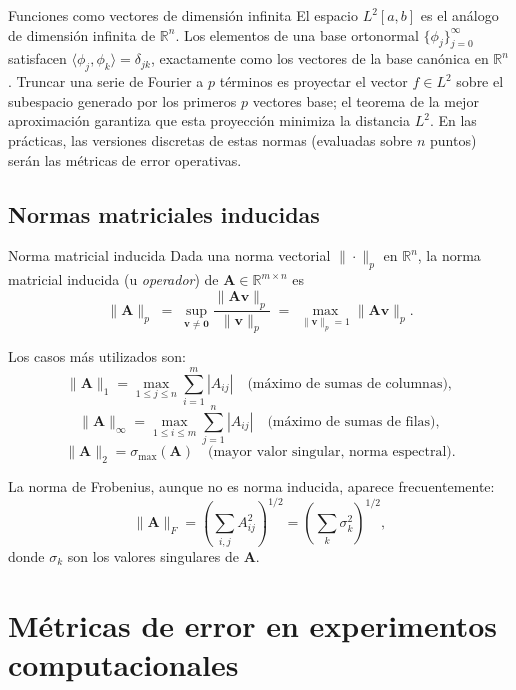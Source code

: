 \begin{fisicaconexion}{Funciones como vectores de dimensión infinita}
El espacio $L^2[a,b]$ es el análogo de dimensión infinita de $\mathbb{R}^n$.
Los elementos de una base ortonormal $\{\phi_j\}_{j=0}^\infty$ satisfacen
$\langle \phi_j, \phi_k \rangle = \delta_{jk}$, exactamente como los
vectores de la base canónica en $\mathbb{R}^n$. Truncar una serie de Fourier
a $p$ términos es proyectar el vector $f \in L^2$ sobre el subespacio
generado por los primeros $p$ vectores base; el teorema de la mejor
aproximación garantiza que esta proyección minimiza la distancia $L^2$.
En las prácticas, las versiones discretas de estas normas (evaluadas sobre
$n$ puntos) serán las métricas de error operativas.
\end{fisicaconexion}

\subsection{Normas matriciales inducidas}
\label{ap:normas_mat}

\begin{definicion}{Norma matricial inducida}
\label{def:norma_mat_ind}
Dada una norma vectorial $\|\cdot\|_p$ en $\mathbb{R}^n$, la norma matricial
inducida (u \textit{operador}) de $\mathbf{A} \in \mathbb{R}^{m \times n}$ es
\[
  \|\mathbf{A}\|_p \;=\; \sup_{\mathbf{v} \neq \mathbf{0}}
  \frac{\|\mathbf{A}\mathbf{v}\|_p}{\|\mathbf{v}\|_p}
  \;=\; \max_{\|\mathbf{v}\|_p = 1} \|\mathbf{A}\mathbf{v}\|_p.
\]
\end{definicion}

Los casos más utilizados son:
\[
  \|\mathbf{A}\|_1 = \max_{1 \leq j \leq n}\sum_{i=1}^m |A_{ij}|
  \quad \text{(máximo de sumas de columnas)},
\]
\[
  \|\mathbf{A}\|_\infty = \max_{1 \leq i \leq m}\sum_{j=1}^n |A_{ij}|
  \quad \text{(máximo de sumas de filas)},
\]
\[
  \|\mathbf{A}\|_2 = \sigma_{\max}(\mathbf{A})
  \quad \text{(mayor valor singular, norma espectral)}.
\]

La norma de Frobenius, aunque no es norma inducida, aparece frecuentemente:
\[
  \|\mathbf{A}\|_F = \left(\sum_{i,j} A_{ij}^2\right)^{1/2}
  = \left(\sum_k \sigma_k^2\right)^{1/2},
\]
donde $\sigma_k$ son los valores singulares de $\mathbf{A}$.

\section{Métricas de error en experimentos computacionales}
\label{ap:metricas_error}

